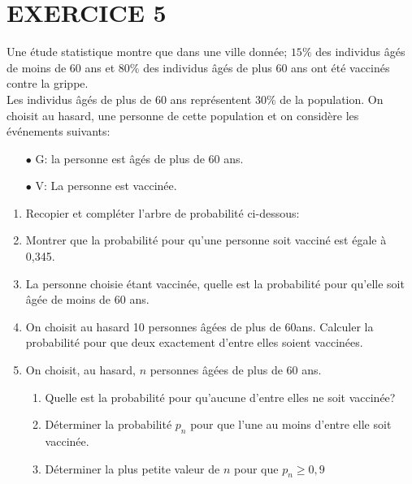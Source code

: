 \documentclass[12pts]{book}
\begin{document}
\section*{EXERCICE 5}
	Une étude statistique montre que dans une ville donnée; $15\%$ des individus âgés de moins de 60 ans et $80\%$ des individus âgés de plus 60 ans ont été vaccinés contre la grippe.\\ Les individus âgés de plus de 60 ans représentent $30\%$ de la population. On choisit au hasard, une personne de cette population et on considère les événements suivants:\\
	\begin{enumerate}
		\item[$\bullet$] G: \fg la personne est âgés de plus de 60 ans\og{}.
		\item[$\bullet$] V: \fg La personne est vaccinée\og{}.
	\end{enumerate}
	\begin{enumerate}
		\item Recopier et compléter l'arbre de probabilité ci-dessous:\\
		\begin{center}
		\end{center}
	\item Montrer que la probabilité pour qu'une personne soit vacciné est égale à 0,345.
	\item La personne choisie étant vaccinée, quelle est la probabilité pour qu'elle soit âgée de moins de 60 ans.
	\item On choisit au hasard 10 personnes âgées de plus de 60ans. Calculer la probabilité pour que deux exactement d'entre elles soient vaccinées.
	\item On choisit, au hasard, $n$ personnes âgées de plus de 60 ans.
		\begin{enumerate}
			\item Quelle est la probabilité pour qu'aucune d'entre elles ne soit vaccinée?
			\item Déterminer la probabilité $p_n$ pour que l'une au moins d'entre elle soit vaccinée.
			\item Déterminer la plus petite valeur de $n$ pour que $p_n \geq 0,9$
		\end{enumerate}
	\end{enumerate}
\end{document}

